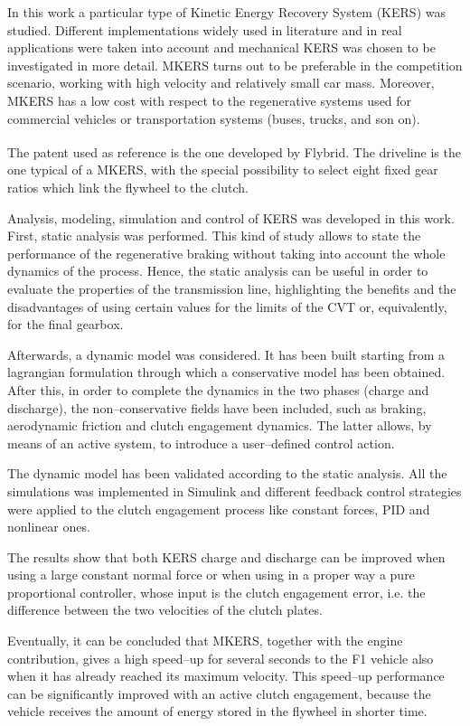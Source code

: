 \documentclass[11pt]{article}
\begin{document}
In this work a particular type of Kinetic Energy Recovery System (KERS) was studied. Different implementations widely used in literature and in real applications were taken into account and mechanical KERS was chosen to be investigated in more detail. MKERS turns out to be preferable in the competition scenario, working with high velocity and relatively small car mass. Moreover, MKERS has a low cost with respect to the regenerative systems used for commercial vehicles or transportation systems (buses, trucks, and son on). 

The patent used as reference is the one developed by Flybrid\textsuperscript\textregistered. The driveline is the one typical of a MKERS, with the special possibility to select eight fixed gear ratios which link the flywheel to the clutch.

Analysis, modeling, simulation and control of KERS was developed in this work. First, static analysis was performed. This kind of study allows to state the performance of the regenerative braking without taking into account the whole dynamics of the process. Hence, the static analysis can be useful in order to evaluate the properties of the transmission line, highlighting the benefits and the disadvantages of using certain values for the limits of the CVT or, equivalently, for the final gearbox. 

Afterwards, a dynamic model was considered. It has been built starting from a lagrangian formulation through which a conservative model has been obtained. After this, in order to complete the dynamics in the two phases (charge and discharge), the non--conservative fields have been included, such as braking, aerodynamic friction and clutch engagement dynamics. The latter allows, by means of an active system, to introduce a user--defined control action.

The dynamic model has been validated according to the static analysis. All the simulations was implemented in Simulink and different feedback control strategies were applied to the clutch engagement process like constant forces, PID and nonlinear ones. 

The results show that both KERS charge and discharge can be improved when using a large constant normal force or when using in a proper way a pure proportional controller, whose input is the clutch engagement error, i.e. the difference between the two velocities of the clutch plates.

Eventually, it can be concluded that MKERS, together with the engine contribution, gives a high speed--up for several seconds to the F1 vehicle also when it has already reached its maximum velocity. This speed--up performance can be significantly improved with an active clutch engagement, because the vehicle receives the amount of energy stored in the flywheel in shorter time.  
\end{document}
